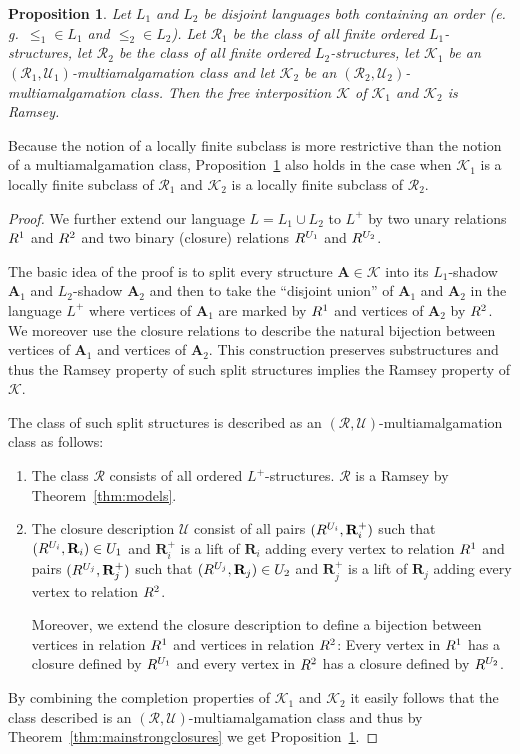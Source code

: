 \documentclass{elsarticle}
\newcommand{\eg}{e.\,g.}
\def\str#1{\mathbf {#1}}
\def\nbrel#1#2{R\ifstrempty{#1}{}{_{#1}}\ifstrempty{#2}{}{^{#2}}}
\def\rel#1#2{\nbrel{\ifstrempty{#1}{}{\str{#1}}}{#2}}
\def\K{{\mathcal K}}
\theoremstyle{plain}
\newtheorem{prop}[theorem]{Proposition}
\theoremstyle{definition}
\theoremstyle{remark}
\begin{document}
\begin{prop}
\label{prop:interpos}
Let $L_1$ and $L_2$ be disjoint languages both containing an order (\eg{}\ $\leq_1\in L_1$ and $\leq_2\in L_2$). Let $\mathcal R_1$ be the class of all finite ordered $L_1$-structures,
let $\mathcal R_2$ be the class of all finite ordered $L_2$-structures, let $\K_1$
be an $(\mathcal R_1,\mathcal U_1)$-multiamalgamation class and let $\K_2$ be an
$(\mathcal R_2,\mathcal U_2)$-multiamalgamation class.  Then the free
interposition $\K$ of $\K_1$ and $\K_2$ is Ramsey.
\end{prop}
Because the notion of a locally finite subclass is more restrictive than the
notion of a multiamalgamation class, Proposition~\ref{prop:interpos} also holds in the case when $\K_1$ is a
locally finite subclass of $\mathcal R_1$ and $\K_2$ is a locally finite
subclass of $\mathcal R_2$.
\begin{proof}
We further extend our language $L=L_1\cup L_2$ to $L^+$ by two unary relations $\rel{}{1}$ and
$\rel{}{2}$ and two binary (closure) relations $\rel{}{U_1}$ and $\rel{}{U_2}$.

The basic idea of the proof is to split every structure $\str{A}\in \K$ into
its $L_1$-shadow $\str{A}_1$ and $L_2$-shadow $\str{A}_2$ and then to take the
``disjoint union'' of $\str{A}_1$ and $\str{A}_2$ in the language $L^+$
where vertices of $\str{A}_1$ are marked by $\rel{}{1}$ and vertices of
$\str{A}_2$ by $\rel{}{2}$. We moreover use the closure relations to describe the natural bijection
between vertices of $\str{A}_1$ and vertices of $\str{A}_2$. This
construction preserves substructures and thus the Ramsey property of such split
structures implies the Ramsey property of $\K$.

The class of such split structures is described as an $(\mathcal R,\mathcal U)$-multi{\-}amal{\-}gamation class as follows:

\begin{enumerate}
 \item The class $\mathcal R$ consists of all ordered $L^+$-structures. $\mathcal R$ is a Ramsey by Theorem~\ref{thm:models}.
 \item The closure description $\mathcal U$ consist of all pairs $(\rel{}{U_i},\str{R}^+_i)$ such that
$(\rel{}{U_i},\allowbreak \str{R}_i)\in U_1$ and $\str{R}^+_i$ is a lift of $\str{R}_i$ adding
every vertex to relation $\rel{}{1}$ and pairs $(\rel{}{U_j},\str{R}^+_j)$ such
that $(\rel{}{U_j},\str{R}_j)\in U_2$ and $\str{R}^+_j$ is a lift of $\str{R}_j$ adding
every vertex to relation $\rel{}{2}$.

Moreover, we extend the closure description to define a bijection between vertices in relation $\rel{}{1}$ and
vertices in relation $\rel{}{2}$: Every vertex in $\rel{}{1}$ has a closure defined by $\rel{}{U_1}$
and every vertex in $\rel{}{2}$ has a closure defined by $\rel{}{U_2}$.
\end{enumerate}
By combining the completion properties of $\K_1$ and $\K_2$ it easily follows that the class described
is an $(\mathcal R,\mathcal U)$-multiamalgamation class and thus by Theorem~\ref{thm:mainstrongclosures}
we get Proposition~\ref{prop:interpos}.
\end{proof}
\end{document}
